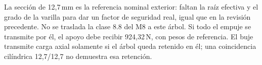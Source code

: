 La sección de 12,7\,mm es la referencia nominal exterior: faltan la raíz
efectiva y el grado de la varilla para dar un factor de seguridad real,
igual que en la revisión precedente. No se traslada la clase 8.8 del M8
a este árbol. Si todo el empuje se transmite por él, el apoyo debe recibir
924,32\,N, con pesos de referencia.
El buje transmite carga axial solamente si el árbol queda retenido en él;
una coincidencia cilíndrica 12,7/12,7 no demuestra esa retención.
